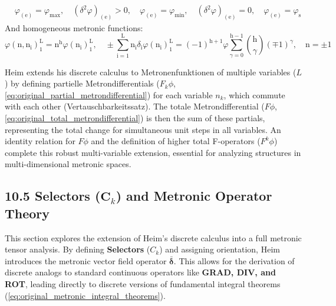 \documentclass[12pt]{article}
\begin{document}
\begin{itemize}
\begin{equation}
\begin{aligned}
    & \varphi_{(\mathrm{e})} = \varphi_{\mathrm{max}}, \quad \left(\delta^2\varphi\right)_{(\mathrm{e})} > 0, \quad \varphi_{(\mathrm{e})} = \varphi_{\mathrm{min}}, \quad \left(\delta^2\varphi\right)_{(\mathrm{e})} = 0, \quad \varphi_{(\mathrm{e})} = \varphi_{\mathrm{s}}
    \end{aligned} \tag{76}
    \end{equation}
    And homogeneous metronic functions:
    \begin{equation}
    \varphi(\mathrm{n}, \mathrm{n_i})_1^\mathrm{L} = \mathrm{n}^\mathrm{h}\varphi(\mathrm{n_i})_1^\mathrm{L}, \quad \pm \sum_{\mathrm{i=1}}^\mathrm{L} \mathrm{n_i} \delta_{\mathrm{i}}\varphi(\mathrm{n_i})_1^\mathrm{L} = (-1)^{\mathrm{h+1}} \varphi \sum_{\gamma=0}^{\mathrm{h-1}} \binom{\mathrm{h}}{\gamma} (\mp 1)^\gamma, \quad \mathrm{n} = \pm 1 \tag{77}
    \end{equation}
\end{itemize}

Heim extends his discrete calculus to Metronenfunktionen of multiple variables (\(L\)) by defining partielle Metrondifferentials (\(F_k\phi\), \eqref{eq:original_partial_metrondifferential}) for each variable \(n_k\), which commute with each other (Vertauschbarkeitssatz). The totale Metrondifferential (\(F\phi\), \eqref{eq:original_total_metrondifferential}) is then the sum of these partials, representing the total change for simultaneous unit steps in all variables. An identity relation for \(F\phi\) and the definition of higher total F-operators (\(F^k\phi\)) complete this robust multi-variable extension, essential for analyzing structures in multi-dimensional metronic spaces.

\subsection{10.5 Selectors (\texorpdfstring{\( \mathbf{C}_k \)}{C\_k}) and Metronic Operator Theory}
\label{sec:selectors}

This section explores the extension of Heim's discrete calculus into a full metronic tensor analysis. By defining \textbf{Selectors} (\(C_k\)) and assigning orientation, Heim introduces the metronic vector field operator \(\bar{\bm{\delta}}\). This allows for the derivation of discrete analogs to standard continuous operators like \textbf{GRAD, DIV, and ROT}, leading directly to discrete versions of fundamental integral theorems (\eqref{eq:original_metronic_integral_theorems}).
\end{document}
